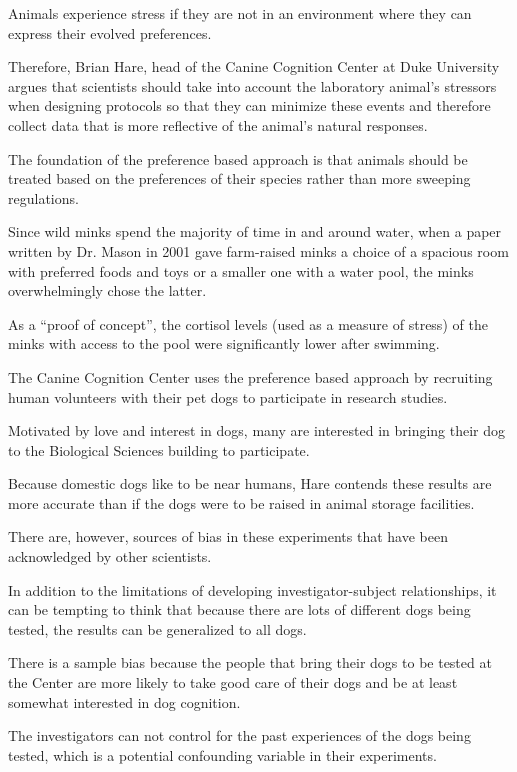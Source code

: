 \bigskip
\begin{inparaenum}[\bfseries 1]
\indent \item Animals experience stress if they are not in an environment where they can express their evolved preferences. \item Therefore, Brian Hare, head of the Canine Cognition Center at Duke University argues that scientists should take into account the laboratory animal's stressors when designing protocols so that they can minimize these events and therefore collect data that is more reflective of the animal's natural responses. \item The foundation of the preference based approach is that animals should be treated based on the preferences of their species rather than more sweeping regulations. \item Since wild minks spend the majority of time in and around water, when a paper written by Dr. Mason in 2001 gave farm-raised minks a choice of a spacious room with preferred foods and toys or a smaller one with a water pool, the minks overwhelmingly chose the latter. \item As a ``proof of concept'', the cortisol levels (used as a measure of stress) of the minks with access to the pool were significantly lower after swimming.

\indent \item The Canine Cognition Center uses the preference based approach by recruiting human volunteers with their pet dogs to participate in research studies. \item Motivated by love and interest in dogs, many are interested in bringing their dog to the Biological Sciences building to participate. \item Because domestic dogs like to be near humans, Hare contends these results are more accurate than if the dogs were to be raised in animal storage facilities. 

\indent \item There are, however, sources of bias in these experiments that have been acknowledged by other scientists. \item In addition to the limitations of developing investigator-subject relationships, it can be tempting to think that because there are lots of different dogs being tested, the results can be generalized to all dogs. \item There is a sample bias because the people that bring their dogs to be tested at the Center are more likely to take good care of their dogs and be at least somewhat interested in dog cognition. \item The investigators can not control for the past experiences of the dogs being tested, which is a potential confounding variable in their experiments. 
\end{inparaenum}


